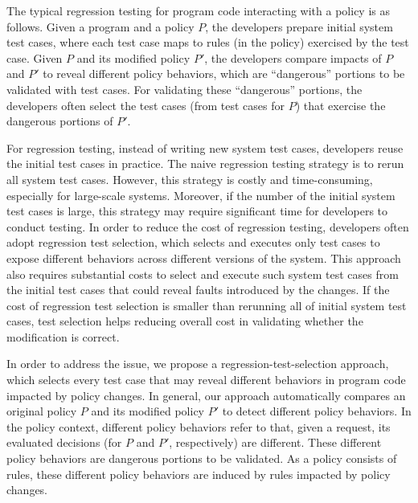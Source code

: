 The typical regression testing for program code interacting with a policy is as follows.
Given a program and a policy $P$, the developers prepare initial system test cases, where
each test case maps to rules (in the policy) exercised by the test case. Given $P$ and its modified
policy $P'$, the developers compare impacts of $P$ and $P'$ to
reveal different policy behaviors, which are ``dangerous'' portions to be validated with
test cases. For validating these ``dangerous'' portions, the developers often select the test cases (from test cases for $P$) that exercise the dangerous
portions of $P'$.

For regression testing, instead of writing new system test cases, developers reuse the initial test cases in practice. The naive regression testing strategy is to rerun all system test cases. However,
 this strategy is costly and time-consuming, especially for large-scale systems. Moreover, if the number of the initial 
system test cases is large, this strategy may require significant time for developers to conduct testing. In order to
 reduce the cost of regression testing, developers often adopt regression test selection, which selects and executes only
 test cases to expose different behaviors across different versions of the system. This approach also requires substantial
 costs to select and execute such system test cases from the initial test cases that could reveal faults introduced by the changes. 
If the cost of regression test selection is smaller than rerunning all of initial system test cases, test selection helps reducing overall cost in validating whether the modification is correct. 


In order to address the issue, we propose a regression-test-selection approach, which selects every test case that may 
reveal different behaviors in program code impacted by policy changes.
In general, our approach automatically compares an original 
policy $P$ and its modified policy $P'$ to detect different policy behaviors. In the policy context, different policy 
behaviors refer to that, given a request, its evaluated decisions (for $P$ and $P'$, respectively) are different.
These different policy behaviors are dangerous portions to be validated.
As a policy consists of rules, these different policy behaviors are induced by rules impacted by policy changes.



